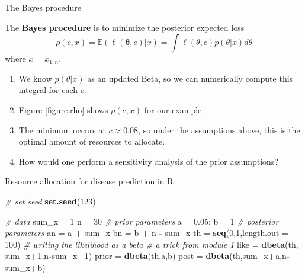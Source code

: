 \documentclass[
  ignorenonframetext,
]{beamer}
\newenvironment{Shaded}{\begin{snugshade}}{\end{snugshade}}
\newcommand{\CommentTok}[1]{\textcolor[rgb]{0.56,0.35,0.01}{\textit{#1}}}
\newcommand{\DataTypeTok}[1]{\textcolor[rgb]{0.13,0.29,0.53}{#1}}
\newcommand{\DecValTok}[1]{\textcolor[rgb]{0.00,0.00,0.81}{#1}}
\newcommand{\FloatTok}[1]{\textcolor[rgb]{0.00,0.00,0.81}{#1}}
\newcommand{\KeywordTok}[1]{\textcolor[rgb]{0.13,0.29,0.53}{\textbf{#1}}}
\newcommand{\NormalTok}[1]{#1}
\newcommand{\OperatorTok}[1]{\textcolor[rgb]{0.81,0.36,0.00}{\textbf{#1}}}
\newcommand{\StringTok}[1]{\textcolor[rgb]{0.31,0.60,0.02}{#1}}
\providecommand{\tightlist}{%
  \setlength{\itemsep}{0pt}\setlength{\parskip}{0pt}}
\newcommand{\btheta}{{\bm\theta}}
\newcommand{\E}{\mathbb{E}}
\begin{document}
\begin{frame}{The Bayes procedure}
\protect\hypertarget{the-bayes-procedure}{}

The \textbf{Bayes procedure} is to minimize the posterior expected loss
\[\rho(c,x) =\E(\ell(\btheta,c)|x) = \int \ell(\theta,c)p(\theta|x)d\theta \]
where \(x = x_{1:n}\).

\begin{enumerate}
\tightlist
\item
  We know \(p(\theta|x)\) as an updated Beta, so we can numerically
  compute this integral for each \(c\).
\item
  Figure \ref{figure:rho} shows \(\rho(c,x)\) for our example.
\item
  The minimum occurs at \(c\approx 0.08\), so under the assumptions
  above, this is the optimal amount of resources to allocate.
\item
  How would one perform a sensitivity analysis of the prior assumptions?
\end{enumerate}

\end{frame}

\begin{frame}[fragile]{Resource allocation for disease prediction in R}
\protect\hypertarget{resource-allocation-for-disease-prediction-in-r}{}

\begin{Shaded}
\begin{Highlighting}[]
\CommentTok{# set seed }
\KeywordTok{set.seed}\NormalTok{(}\DecValTok{123}\NormalTok{)}

\CommentTok{# data}
\NormalTok{sum_x =}\StringTok{ }\DecValTok{1}
\NormalTok{n =}\StringTok{ }\DecValTok{30}
\CommentTok{# prior parameters}
\NormalTok{a =}\StringTok{ }\FloatTok{0.05}\NormalTok{; b =}\StringTok{ }\DecValTok{1}
\CommentTok{# posterior parameters}
\NormalTok{an =}\StringTok{ }\NormalTok{a }\OperatorTok{+}\StringTok{ }\NormalTok{sum_x}
\NormalTok{bn =}\StringTok{ }\NormalTok{b }\OperatorTok{+}\StringTok{ }\NormalTok{n }\OperatorTok{-}\StringTok{ }\NormalTok{sum_x}
\NormalTok{th =}\StringTok{ }\KeywordTok{seq}\NormalTok{(}\DecValTok{0}\NormalTok{,}\DecValTok{1}\NormalTok{,}\DataTypeTok{length.out =} \DecValTok{100}\NormalTok{)}
\CommentTok{# writing the likelihood as a beta }
\CommentTok{# a trick from module 1}
\NormalTok{like =}\StringTok{ }\KeywordTok{dbeta}\NormalTok{(th, sum_x}\OperatorTok{+}\DecValTok{1}\NormalTok{,n}\OperatorTok{-}\NormalTok{sum_x}\OperatorTok{+}\DecValTok{1}\NormalTok{)}
\NormalTok{prior =}\StringTok{ }\KeywordTok{dbeta}\NormalTok{(th,a,b)}
\NormalTok{post =}\StringTok{ }\KeywordTok{dbeta}\NormalTok{(th,sum_x}\OperatorTok{+}\NormalTok{a,n}\OperatorTok{-}\NormalTok{sum_x}\OperatorTok{+}\NormalTok{b)}
\end{Highlighting}
\end{Shaded}

\end{frame}
\end{document}

